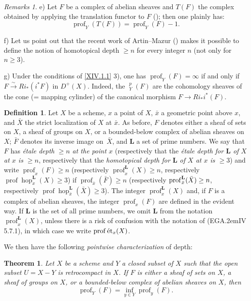 \documentclass[11pt,a4paper,oneside]{book}
\providecommand{\sisi}[2]{#2}
\providecommand{\pageoriginale}{%
  \refstepcounter{pageoriginal}%
  \marginpar{\raggedright\footnotesize\bfseries\thepageoriginal}%
  \xspace}
\providecommand{\EGA}{\textup{EGA}\kern.2em}
\providecommand{\LL}{\mathbf L}
\DeclareMathOperator{\hop}{hop}
\providecommand{\h}{\mathop{\underline{H}}\nolimits}
\providecommand{\prof}{\operatorname{prof}}
\providecommand{\isomto}{\overset{\sim}{\longrightarrow}}
\providecommand{\et}{\textup{\'et}}
\theoremstyle{plain}
\newtheorem{theoreme}[subsection]{Theorem}
\theoremstyle{definition}
\newtheorem{definition}[subsection]{Definition}
\theoremstyle{remark}
\newtheorem{remarques}[subsection]{Remarks}
\renewcommand{\Ref}[1]{\textup{\ref{#1}}}
\begin{document}
\begin{remarques}
e) Let $F$ be a complex of abelian sheaves and $T(F)$ the complex obtained by applying the translation functor to $F$ (\cite{XIV.3}); then one plainly has:
$$
\prof_Y(T(F))=\prof_Y(F)-1.
$$

f) Let us point out that the recent work of Artin--Mazur (\cite{XIV.1}) makes it possible to define the notion of homotopical depth $\geq n$ for every integer $n$ (not only for $n\geq 3$).

g) Under the conditions of \Ref{XIV.1.1} 3), one has $\prof_Y(F)=\infty$ if and only if $F\isomto Ri_*(i^*F)$ in $D^+(X)$. Indeed, the ${\h}_Y^p(F)$ are the cohomology sheaves of the cone (= mapping cylinder) of the canonical morphism $F\to Ri_*i^*(F)$.
\end{remarques}

\begin{definition} \label{XIV.1.7}
Let $X$ be a scheme, $x$ a point of $X$, $\bar x$ a geometric point above $x$, and $\bar X$ the strict localization of $X$ at $\bar x$. As before, $F$ denotes either a sheaf of sets on $X$, a sheaf of groups on $X$, or a bounded-below complex of abelian sheaves on $X$; $\bar F$ denotes its inverse image on~$\bar X$, and $\LL$ a set of prime numbers. We say that $F$ has \emph{étale depth $\geq n$ at the point $x$}\pageoriginale (respectively that the \emph{étale depth for $\LL$ of $X$ at $x$ is $\geq n$}, respectively that the \emph{homotopical depth for $\LL$ of $X$ at $x$ is $\geq 3$}) and write $\prof_x(F)\geq n$ (respectively $\prof_x^{\LL}(X)\geq n$, respectively $\prof \hop_x^{\LL}(X)\geq \sisi{3}{3}$) if $\prof_{\bar x}(\bar F)\geq n$ (respectively $\prof_{\bar x}^{\LL}(\bar X)\geq\nobreak n$, respectively $\prof \hop_{\bar x}^{\LL}(\bar X)\geq \sisi{3}{3}$). The integer $\prof_x^{\LL}(X)$ and, if $F$ is a complex of abelian sheaves, the integer $\prof_x(F)$ are defined in the evident way. If $\LL$ is the set of all prime numbers, we omit $\LL$ from the notation $\prof_x^{\LL}(X)$, unless there is a risk of confusion with the notation of \textup{(\EGA IV 5.7.1)}, in which case we write $\prof \et_x(X)$.
\end{definition}

We then have the following \textit{pointwise characterization} of depth:

\begin{theoreme} \label{XIV.1.8} Let $X$ be a scheme and $Y$ a closed subset of $X$ such that the open subset $U=X-Y$ is retrocompact in $X$. If $F$ is either a sheaf of sets on $X$, a sheaf of groups on $X$, or a bounded-below complex of abelian sheaves on $X$, then
$$
\prof_Y(F)=\inf_{y\in Y} \prof_y(F).
$$
\end{theoreme}
\end{document}
